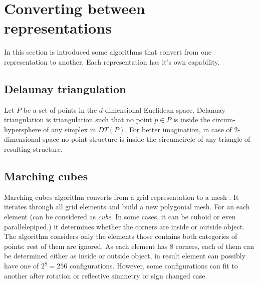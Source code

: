 \section{Converting between representations}

In this section is introduced some algorithms that convert from one representation to another. Each 
representation has it's own capability.

\subsection{Delaunay triangulation}

Let $P$ be a set of points in the $d$-dimensional Euclidean space.
Delanuay triangulation is triangulation such that no point $p \in P$ is inside the circum-hypersphere
of any simplex in $DT(P)$. For better imagination, in case of $2$-dimensional space no point
structure is inside the circumcircle of any triangle of resulting structure.

\subsection{Marching cubes}
\label{sub:march}

Marching cubes algorithm converts from a grid representation to a mesh \cite{Lorensen1987}. It iterates through
all grid elements and build a new polygonial mesh. For an each element (can be considered as \emph{cube}.
In some cases, it can be cuboid or even parallelepiped.)
it determines whether the corners are inside or outside object. The algorithm considers only the elements
those contains both categories of points; rest of them are ignored. As each element has 8 corners,
each of them can be determined either as inside or outside object, in result element can possibly
have one of $2^8 = 256$ configurations. However, some configurations can fit to another after rotation
or reflective simmetry or sign changed case.\\


